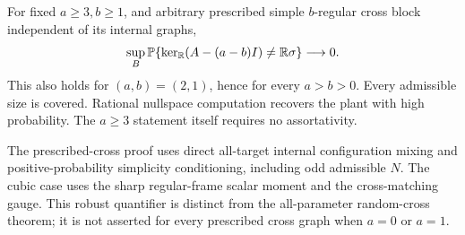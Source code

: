 \begin{corollary}\label{cor:two-frame}
For fixed $a\ge3,b\ge1$, and arbitrary prescribed simple $b$-regular
cross block independent of its internal graphs,
\[
 \sup_B\mathbb P\{\ker_\mathbb R(A-(a-b)I)\ne\mathbb R\sigma\}\longrightarrow0.
\]
This also holds for $(a,b)=(2,1)$, hence for every $a>b>0$.
Every admissible size is covered. Rational nullspace computation
recovers the plant with high probability. The $a\ge3$ statement
itself requires no assortativity.
\end{corollary}

The prescribed-cross proof uses direct all-target internal configuration
mixing and positive-probability simplicity conditioning, including odd
admissible $N$. The cubic case uses the sharp regular-frame scalar
moment and the cross-matching gauge. This robust quantifier is distinct
from the all-parameter random-cross theorem; it is not asserted for
every prescribed cross graph when $a=0$ or $a=1$.

